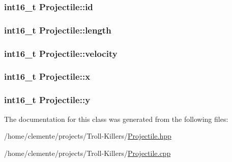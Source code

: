 \subsubsection[{id}]{\setlength{\rightskip}{0pt plus 5cm}int16\+\_\+t Projectile\+::id\hspace{0.3cm}{\ttfamily [protected]}}\label{class_projectile_a4d5668615b5f58f8c7a2b4e0bf41d493}
\hypertarget{class_projectile_a123f18a0665fd6ae48dcbd900647defb}{}
\subsubsection[{length}]{\setlength{\rightskip}{0pt plus 5cm}int16\+\_\+t Projectile\+::length\hspace{0.3cm}{\ttfamily [protected]}}\label{class_projectile_a123f18a0665fd6ae48dcbd900647defb}
\hypertarget{class_projectile_a0f40006b298e765555e5494f3bbdc929}{}
\subsubsection[{velocity}]{\setlength{\rightskip}{0pt plus 5cm}int16\+\_\+t Projectile\+::velocity\hspace{0.3cm}{\ttfamily [protected]}}\label{class_projectile_a0f40006b298e765555e5494f3bbdc929}
\hypertarget{class_projectile_a706363cbafcbe19aa68853b2821e63b5}{}
\subsubsection[{x}]{\setlength{\rightskip}{0pt plus 5cm}int16\+\_\+t Projectile\+::x\hspace{0.3cm}{\ttfamily [protected]}}\label{class_projectile_a706363cbafcbe19aa68853b2821e63b5}
\hypertarget{class_projectile_a19d3eab0725a2679d39c6d316e3681ca}{}
\subsubsection[{y}]{\setlength{\rightskip}{0pt plus 5cm}int16\+\_\+t Projectile\+::y\hspace{0.3cm}{\ttfamily [protected]}}\label{class_projectile_a19d3eab0725a2679d39c6d316e3681ca}


The documentation for this class was generated from the following files\+:\begin{DoxyCompactItemize}
\item 
/home/clemente/projects/\+Troll-\/\+Killers/\hyperlink{_projectile_8hpp}{Projectile.\+hpp}\item 
/home/clemente/projects/\+Troll-\/\+Killers/\hyperlink{_projectile_8cpp}{Projectile.\+cpp}\end{DoxyCompactItemize}
